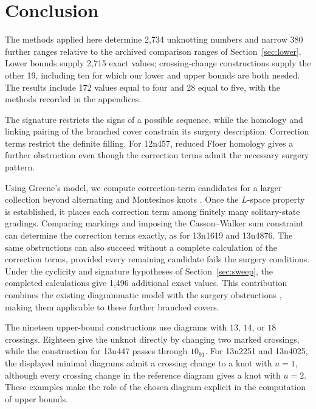 \documentclass[12pt, oneside]{amsart}
\newcommand{\kn}[2]{\textup{#1#2}}
\newcommand{\nExactUpper}{19}
\newcommand{\nExact}{2{,}734}
\newcommand{\nExactLower}{2{,}715}
\newcommand{\nImproved}{380}
\newcommand{\nSweepNewExact}{1{,}496}
\newcommand{\nUfive}{28}
\newcommand{\nUfour}{172}
\begin{document}
\raggedbottom
\section{Conclusion}\label{sec:conclusion}

The methods applied here determine \nExact{} unknotting numbers and narrow
\nImproved{} further ranges relative to the archived comparison ranges
of Section~\ref{sec:lower}. Lower bounds supply \nExactLower{} exact values;
crossing-change constructions supply the other \nExactUpper{}, including
ten for which our lower and upper bounds are both needed. The results include
\nUfour{} values equal to four and \nUfive{} equal to five, with the methods
recorded in the appendices.

The signature restricts the signs of a possible sequence, while the homology
and linking pairing of the branched cover constrain its surgery description.
Correction terms restrict the definite filling. For \kn{12n}{457}, reduced
Floer homology gives a further obstruction even though the correction terms
admit the necessary surgery pattern.

Using Greene's model, we compute correction-term candidates for a larger
collection beyond alternating and Montesinos knots \cite{Greene}. Once the
$L$-space property is established,
it places each correction term among finitely many solitary-state gradings.
Comparing markings and imposing the Casson--Walker sum constraint can
determine the correction terms exactly, as for \kn{13n}{1619} and
\kn{13n}{4876}. The same obstructions can also succeed without a complete
calculation of the correction terms, provided every remaining candidate
fails the surgery conditions. Under the
cyclicity and signature hypotheses of Section~\ref{sec:sweep}, the completed
calculations give \nSweepNewExact{} additional exact values. This contribution
combines the existing diagrammatic model with the surgery obstructions
\cite{Owens,NiWu}, making them applicable to these further branched covers.

The nineteen upper-bound constructions use diagrams with $13$, $14$, or
$18$ crossings. Eighteen give the unknot directly by changing two marked
crossings, while the construction for \kn{13n}{447} passes through $10_{91}$.
For \kn{13n}{2251} and \kn{13n}{4025}, the displayed minimal diagrams admit a
crossing change to a knot with $u=1$, although every crossing change in the
reference diagram gives a knot with $u=2$. These examples make the role of
the chosen diagram explicit in the computation of upper bounds.
\end{document}
